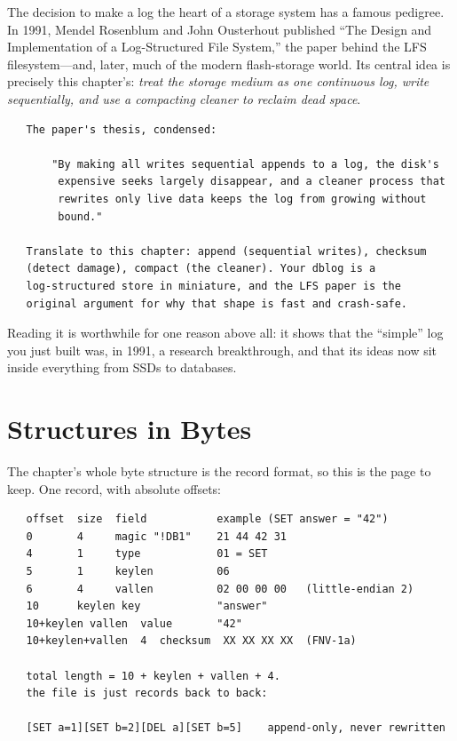\begin{researchnote}
The decision to make a log the heart of a storage system has a famous
pedigree. In 1991, Mendel Rosenblum and John Ousterhout published
``The Design and Implementation of a Log-Structured File System,'' the
paper behind the LFS filesystem---and, later, much of the modern
flash-storage world. Its central idea is precisely this chapter's:
\emph{treat the storage medium as one continuous log, write
sequentially, and use a compacting cleaner to reclaim dead space}.

\begin{verbatim}
   The paper's thesis, condensed:

       "By making all writes sequential appends to a log, the disk's
        expensive seeks largely disappear, and a cleaner process that
        rewrites only live data keeps the log from growing without
        bound."

   Translate to this chapter: append (sequential writes), checksum
   (detect damage), compact (the cleaner). Your dblog is a
   log-structured store in miniature, and the LFS paper is the
   original argument for why that shape is fast and crash-safe.
\end{verbatim}

Reading it is worthwhile for one reason above all: it shows that the
``simple'' log you just built was, in 1991, a research breakthrough,
and that its ideas now sit inside everything from SSDs to databases.

\end{researchnote}

\section{Structures in Bytes}

The chapter's whole byte structure is the record format, so this is
the page to keep. One record, with absolute offsets:

\begin{verbatim}
   offset  size  field           example (SET answer = "42")
   0       4     magic "!DB1"    21 44 42 31
   4       1     type            01 = SET
   5       1     keylen          06
   6       4     vallen          02 00 00 00   (little-endian 2)
   10      keylen key            "answer"
   10+keylen vallen  value       "42"
   10+keylen+vallen  4  checksum  XX XX XX XX  (FNV-1a)

   total length = 10 + keylen + vallen + 4.
   the file is just records back to back:

   [SET a=1][SET b=2][DEL a][SET b=5]    append-only, never rewritten
\end{verbatim}

